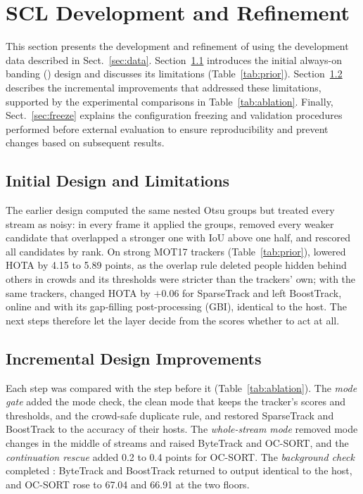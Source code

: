 \section{SCL Development and Refinement}\label{sec:development}

This section presents the development and refinement of \scl{} using the development data
described in Sect.~\ref{sec:data}. Section~\ref{sec:prior} introduces the initial always-on banding
(\aob{}) design and discusses its limitations (Table~\ref{tab:prior}). Section~\ref{sec:steps}
describes the incremental improvements that addressed these limitations, supported by the
experimental comparisons in Table~\ref{tab:ablation}. Finally, Sect.~\ref{sec:freeze} explains the
configuration freezing and validation procedures performed before external evaluation to ensure
reproducibility and prevent changes based on subsequent results.



\subsection{Initial Design and Limitations}\label{sec:prior}
The earlier design \aob{} computed the same nested Otsu groups but treated every stream as noisy:
in every frame it applied the groups, removed every weaker candidate that overlapped a stronger one
with IoU above one half, and rescored all candidates by rank. On strong MOT17 trackers
(Table~\ref{tab:prior}), \aob{} lowered HOTA by 4.15 to 5.89 points, as the overlap rule deleted
people hidden behind others in crowds and its thresholds were stricter than the trackers' own; with
the same trackers, \scl{} changed HOTA by $+0.06$ for SparseTrack and left BoostTrack, online and with
its gap-filling post-processing (GBI), identical to the host. The next steps therefore let the layer
decide from the scores whether to act at all.

\subsection{Incremental Design Improvements}\label{sec:steps}
Each step was compared with the step before it (Table~\ref{tab:ablation}). The \emph{mode gate}
added the mode check, the clean mode that keeps the tracker's scores and thresholds, and the
crowd-safe duplicate rule, and restored SparseTrack and BoostTrack to the accuracy of their hosts.
The \emph{whole-stream mode} removed mode changes in the middle of streams and raised ByteTrack and
OC-SORT, and the \emph{continuation rescue} added 0.2 to 0.4 points for OC-SORT. The
\emph{background check} completed \scl{}: ByteTrack and BoostTrack returned to output identical to
the host, and OC-SORT rose to 67.04 and 66.91 at the two floors.

